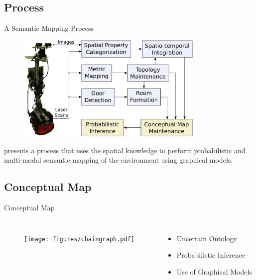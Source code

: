 \documentclass[compress]{beamer}
\begin{document}
\subsection{Process}
\begin{frame}{A Semantic Mapping Process}
  \begin{figure}
    \includegraphics[width=0.8\textwidth]{figures/dora-architecture.pdf}
  \end{figure}
  \cite{pronobis2011semmap} presents a process that uses the spatial knowledge
  to perform probabilistic and multi-modal semantic mapping of the environment
  using graphical models.
\end{frame}

\subsection{Conceptual Map}
\begin{frame}{Conceptual Map}
  \begin{columns}[c]
    \begin{figure}
      \texttt{[image: figures/chaingraph.pdf]}
    \end{figure}
    \begin{itemize}
      \item Uncertain Ontology
      \item Probabilistic Inference
      \item Use of Graphical Models
    \end{itemize}
  \end{columns}

\end{frame}
\end{document}
